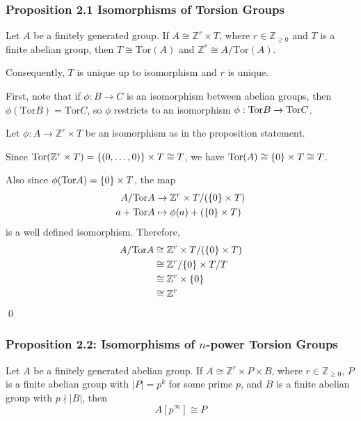 \documentclass{article}
\renewenvironment{proof}{{\bfseries\color{blue1} Proof:}}{\qed}
\begin{document}
\subsubsection{Proposition 2.1 Isomorphisms of Torsion Groups}
\begin{idea}
    Let $A$ be a finitely generated group. If $A \cong \mathbb{Z}^r \times T$, where $r \in \mathbb{Z}_{\ge 0}$ and $T$ is a finite abelian group, then $T \cong \text{Tor}(A)$ and $\mathbb{Z}^r \cong A/\text{Tor}(A)$.
    \vspace{2mm}

    Consequently, $T$ is unique up to isomorphism and $r$ is unique.
\end{idea}
\begin{proof}
    First, note that if $\phi: B\rightarrow C$ is an isomorphism between abelian groups, then $\phi(\text{Tor}B)=\text{Tor}C$, so $\phi$ restricts to an isomorphism $\phi: \mathrm{Tor} B \rightarrow \mathrm{Tor} C$.

    Let $\phi: A\rightarrow \mathbb{Z}^r \times T$ be an isomorphism as in the proposition statement. 

    Since $\mathrm{Tor}(\mathbb{Z}^r \times T) = \{(0,\dots,0)\} \times T \cong T$, we have $\mathrm{Tor}(A) \cong \{0\} \times T \cong T$.

    Also since $\phi(\mathrm{Tor} A)= \{0\} \times T$, the map
    \begin{align*}
        A/\mathrm{Tor} A &\rightarrow \mathbb{Z}^r \times T/(\{0\} \times T) \\ 
        a + \mathrm{Tor} A &\mapsto \phi(a) + (\{0\} \times T)
    \end{align*}
    is a well defined isomorphism. Therefore,
    \begin{align*}
        A/\mathrm{Tor} A & \cong \mathbb{Z}^r \times T/(\{0\} \times T) \\ 
        &\cong \mathbb{Z}^r/\{0\} \times T/T \\ 
        &\cong \mathbb{Z}^r \times \{0\} \\ 
        &\cong \mathbb{Z}^r
    \end{align*}
\end{proof}
\subsubsection{Proposition 2.2: Isomorphisms of $n$-power Torsion Groups}
\begin{idea}
    Let $A$ be a finitely generated abelian group. If $A \cong \mathbb{Z}^r \times P \times B$, where $r \in \mathbb{Z}_{\ge 0}$, $P$ is a finite abelian group with $|P|=p^k$ for some prime $p$, and $B$ is a finite abelian group with $p\nmid |B|$, then
    \begin{equation*}
        A[p^\infty] \cong P
    \end{equation*}
\end{idea}
\end{document}
